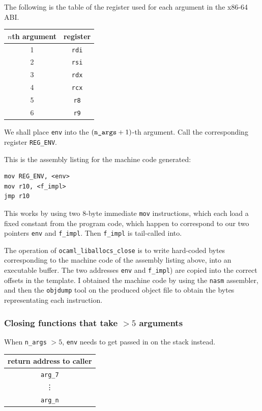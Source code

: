 \documentclass[12pt,a4paper,twoside,openright]{report}
\begin{document}
The following is the table of the register used for each argument in the x86-64
ABI.

\begin{center}
\begin{tabular}{ c | c }
  $n$th argument & register \\
  \hline
  1 & \lstinline!rdi! \\
  2 & \lstinline!rsi! \\
  3 & \lstinline!rdx! \\
  4 & \lstinline!rcx! \\
  5 & \lstinline!r8! \\
  6 & \lstinline!r9!
\end{tabular}
\end{center}

We shall place \lstinline!env! into the $(\text{\texttt{n\char`_args}}+1)$-th
argument. Call the corresponding register \lstinline!REG_ENV!.

This is the assembly listing for the machine code generated:

\begin{lstlisting}
mov REG_ENV, <env>
mov r10, <f_impl>
jmp r10
\end{lstlisting}

This works by using two 8-byte immediate \lstinline!mov! instructions, which
each load a fixed constant from the program code, which happen to correspond to
our two pointers \lstinline!env! and \lstinline!f_impl!.
Then \lstinline!f_impl! is tail-called into.

The operation of \lstinline!ocaml_liballocs_close! is to write hard-coded bytes
corresponding to the machine code of the assembly listing above, into an
executable buffer. The two addresses \lstinline!env! and \lstinline!f_impl!)
are copied into the correct offsets in the template. I obtained the machine
code by using the \lstinline!nasm! assembler, and then the
\lstinline!objdump! tool on the produced object file to obtain the bytes
representating each instruction.

\subsubsection{Closing functions that take $> 5$ arguments}

When \lstinline!n_args! $> 5$, \lstinline!env! needs to get passed in on the
stack instead.

\begin{tabular}{c}
  return address to caller
  \\ \hline\hline
  \lstinline!arg_7!
  \\ \hline
  \vdots
  \\ \hline
  \lstinline!arg_n!
\end{tabular}
\end{document}
